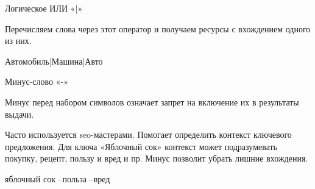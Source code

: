 \documentclass[a4paper]{article}
\begin{document}
Логическое ИЛИ «|»

Перечисляем слова через этот оператор и получаем ресурсы с вхождением одного из них.

Автомобиль|Машина|Авто

Минус-слово «-»

Минус перед набором символов означает запрет на включение их в результаты выдачи.

Часто используется seo-мастерами. Помогает определить контекст ключевого предложения. Для ключа «Яблочный сок» контекст может подразумевать покупку, рецепт, пользу и вред и пр. Минус позволит убрать лишние вхождения.

яблочный сок –польза –вред


\end{document}
